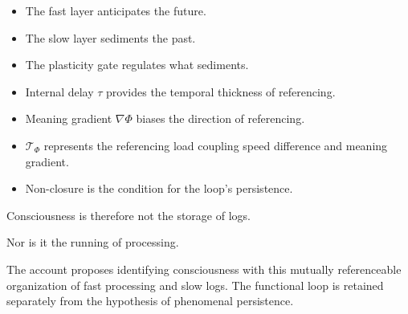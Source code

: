 \begin{itemize}
\item The fast layer anticipates the future.
\item The slow layer sediments the past.
\item The plasticity gate regulates what sediments.
\item Internal delay $\tau$ provides the temporal thickness of referencing.
\item Meaning gradient $\nabla\Phi$ biases the direction of referencing.
\item $\mathcal{T}_{\Phi}$ represents the referencing load coupling speed difference and meaning gradient.
\item Non-closure is the condition for the loop's persistence.
\end{itemize}

Consciousness is therefore not the storage of logs.

Nor is it the running of processing.

The account proposes identifying consciousness with this mutually referenceable organization of fast processing and slow logs. The functional loop is retained separately from the hypothesis of phenomenal persistence.

